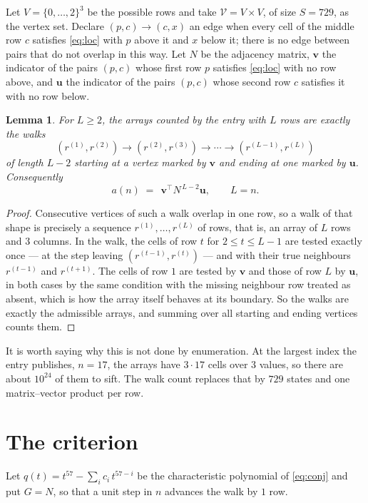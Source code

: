 \documentclass[11pt,a4paper]{article}
\theoremstyle{plain}
\newtheorem{lemma}[theorem]{Lemma}
\theoremstyle{definition}
\begin{document}
Let $V=\{0,\dots,2\}^{3}$ be the possible rows and take
$\mathcal V=V\times V$, of size $S=729$, as the vertex set. Declare $(p,c)\to(c,x)$ an edge
when every cell of the middle row $c$ satisfies \eqref{eq:loc} with $p$ above it and $x$
below it; there is no edge between pairs that do not overlap in this way. Let $N$ be the
adjacency matrix, $\mathbf{v}$ the indicator of the pairs $(p,c)$ whose first row $p$
satisfies \eqref{eq:loc} with no row above, and $\mathbf{u}$ the indicator of
the pairs $(p,c)$ whose second row $c$ satisfies it with no row below.

\begin{lemma}\label{lem:walk}
For $L\ge2$, the arrays counted by the entry with $L$ rows are exactly the walks
\[
(r^{(1)},r^{(2)})\to(r^{(2)},r^{(3)})\to\cdots\to(r^{(L-1)},r^{(L)})
\]
of length $L-2$ starting at a vertex marked by $\mathbf{v}$ and ending at one marked by
$\mathbf{u}$. Consequently
\[
a(n)\;=\;\,\mathbf{v}^{\!\top}N^{\,L-2}\mathbf{u},\qquad L=n .
\]
\end{lemma}

\begin{proof}
Consecutive vertices of such a walk overlap in one row, so a walk of that shape is
precisely a sequence $r^{(1)},\dots,r^{(L)}$ of rows, that is, an array of $L$ rows
and $3$ columns. In the walk, the cells of row $t$ for $2\le t\le L-1$ are tested
exactly once --- at the step leaving $(r^{(t-1)},r^{(t)})$ --- and with their true
neighbours $r^{(t-1)}$ and $r^{(t+1)}$. The cells of row $1$ are tested by
$\mathbf{v}$ and those of row $L$ by $\mathbf{u}$, in both cases by the same condition
with the missing neighbour row treated as absent, which is how the array itself behaves at
its boundary. So the walks are exactly the admissible arrays, and summing over all starting
and ending vertices counts them.
\end{proof}


It is worth saying why this is not done by enumeration. At the largest index the entry
publishes, $n=17$, the arrays have $3\cdot17$ cells over
$3$ values, so there are about $10^{24}$ of them to sift. The
walk count replaces that by $729$ states and one matrix--vector product per row.
\section{The criterion}

Let $q(t)=t^{57}-\sum_i c_i\,t^{57-i}$ be the characteristic polynomial of
\eqref{eq:conj} and put $G=N$, so that a unit step in $n$ advances the walk by
$1$ row.
\end{document}
